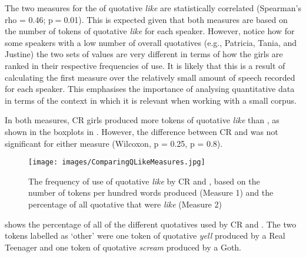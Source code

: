 The two measures for the  of quotative \textit{like} are statistically correlated (Spearman's rho = 0.46; p$=$0.01). This is expected given that both measures are based on the number of tokens of quotative \textit{like} for each speaker. However, notice how for some speakers with a low number of overall quotatives (e.g., Patricia, Tania, and Justine) the two sets of values are very different in terms of how the girls are ranked in their respective frequencies of use. It is likely that this is a result of calculating the first measure over the relatively small amount of speech recorded for each speaker. This emphasises the importance of analysing quantitative data in terms of the context in which it is relevant when working with a small corpus. 

In both measures, CR girls produced more tokens of quotative \textit{like} than , as shown in the boxplots in . However, the difference between CR and  was not significant for either measure (Wilcoxon, p = 0.25, p = 0.8). 

\begin{figure}[p]
	\centering
		\texttt{[image: images/ComparingQLikeMeasures.jpg]}
	\caption{The frequency of use of quotative \textit{like} by CR and , based on the number of tokens per hundred words produced (Measure 1) and the percentage of all quotative that were \textit{like} (Measure 2)}
	\label{fig:ComparingQLikeMeasures}
\end{figure}

 shows the percentage of all of the different quotatives used by CR and . The two tokens labelled as `other' were one token of quotative \textit{yell} produced by a Real Teenager and one token of quotative \textit{scream} produced by a Goth. 

